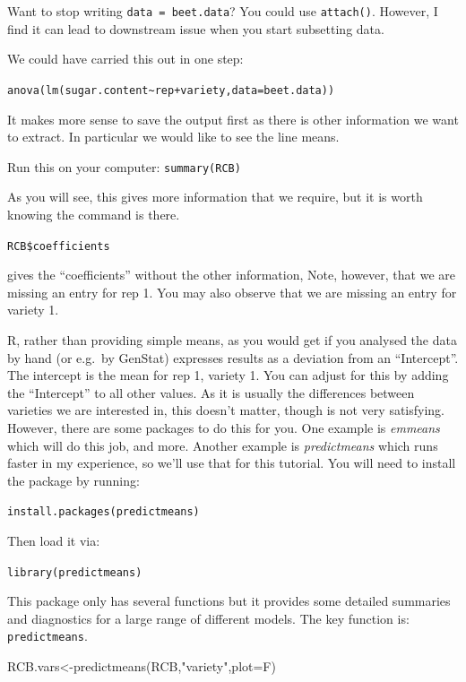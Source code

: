 \documentclass[
]{book}
\makeatletter
\newenvironment{Shaded}{\begin{snugshade}}{\end{snugshade}}
\newcommand{\AttributeTok}[1]{\textcolor[rgb]{0.77,0.63,0.00}{#1}}
\newcommand{\FunctionTok}[1]{\textcolor[rgb]{0.00,0.00,0.00}{#1}}
\newcommand{\NormalTok}[1]{#1}
\newcommand{\OtherTok}[1]{\textcolor[rgb]{0.56,0.35,0.01}{#1}}
\newcommand{\StringTok}[1]{\textcolor[rgb]{0.31,0.60,0.02}{#1}}
\newenvironment{kframe}{%
\medskip{}
\setlength{\fboxsep}{.8em}
 \def\at@end@of@kframe{}%
 \ifinner\ifhmode%
  \def\at@end@of@kframe{\end{minipage}}%
  \begin{minipage}{\columnwidth}%
 \fi\fi%
 \def\FrameCommand##1{\hskip\@totalleftmargin \hskip-\fboxsep
 \colorbox{shadecolor}{##1}\hskip-\fboxsep
     \hskip-\linewidth \hskip-\@totalleftmargin \hskip\columnwidth}%
 \MakeFramed {\advance\hsize-\width
   \@totalleftmargin\z@ \linewidth\hsize
   \@setminipage}}%
 {\par\unskip\endMakeFramed%
 \at@end@of@kframe}
\newenvironment{rmdblock}[1]
  {
  \begin{itemize}
  \renewcommand{\labelitemi}{
    \raisebox{-.7\height}[0pt][0pt]{
      {\setkeys{Gin}{width=3em,keepaspectratio}\texttt{[image: images/\#1]}}
    }
  }
  \setlength{\fboxsep}{1em}
  \begin{kframe}
  \item
  }
  {
  \end{kframe}
  \end{itemize}
  }
\newenvironment{rmdnote}
  {\begin{rmdblock}{note}}
  {\end{rmdblock}}
\makeatother
\begin{document}
\begin{rmdnote}
Want to stop writing \texttt{data\ =\ beet.data}? You could use \texttt{attach()}. However, I find it can lead to downstream issue when you start subsetting data.
\end{rmdnote}

We could have carried this out in one step:

\texttt{anova(lm(sugar.content\textasciitilde{}rep+variety,data=beet.data))}

It makes more sense to save the output first as there is other information we want to extract. In particular we would like to see the line means.

Run this on your computer:
\texttt{summary(RCB)}

As you will see, this gives more information that we require, but it is worth knowing the command is there.

\texttt{RCB\$coefficients}

gives the ``coefficients'' without the other information, Note, however, that we are missing an entry for rep 1. You may also observe that we are missing an entry for variety 1.

R, rather than providing simple means, as you would get if you analysed the data by hand (or e.g.~by GenStat) expresses results as a deviation from an ``Intercept''. The intercept is the mean for rep 1, variety 1. You can adjust for this by adding the ``Intercept'' to all other values. As it is usually the differences between varieties we are interested in, this doesn't matter, though is not very satisfying. However, there are some packages to do this for you. One example is \emph{emmeans} \citep{R-emmeans} which will do this job, and more. Another example is \emph{predictmeans} \citep{R-predictmeans} which runs faster in my experience, so we'll use that for this tutorial. You will need to install the package by running:

\texttt{install.packages(\textquotesingle{}predictmeans\textquotesingle{})}

Then load it via:

\texttt{library(predictmeans)}

This package only has several functions but it provides some detailed summaries and diagnostics for a large range of different models. The key function is: \texttt{predictmeans}.

\begin{Shaded}
\begin{Highlighting}[]
\NormalTok{RCB.vars}\OtherTok{\textless{}{-}}\FunctionTok{predictmeans}\NormalTok{(RCB,}\StringTok{"variety"}\NormalTok{,}\AttributeTok{plot=}\NormalTok{F)}
\end{Highlighting}
\end{Shaded}
\end{document}

